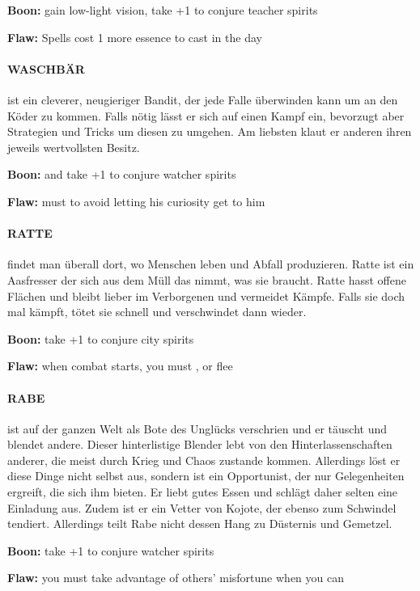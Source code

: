 \textbf{Boon:} gain low-light vision, take +1 to conjure teacher spirits

\textbf{Flaw:} Spells cost 1 more essence to cast in the day


\paragraph{WASCHBÄR} ist ein cleverer, neugieriger Bandit, der jede Falle überwinden kann um an den Köder zu kommen. Falls nötig lässt er sich auf einen Kampf ein, bevorzugt aber Strategien und Tricks um diesen zu umgehen. Am liebsten klaut er anderen ihren jeweils wertvollsten Besitz. 

\textbf{Boon:} and take +1 to conjure watcher spirits

\textbf{Flaw:} must  to avoid letting his curiosity get to him


\paragraph{RATTE} findet man überall dort, wo Menschen leben und Abfall produzieren. Ratte ist ein Aasfresser der sich aus dem Müll das nimmt, was sie braucht. Ratte hasst offene Flächen und bleibt lieber im Verborgenen und vermeidet Kämpfe. Falls sie doch mal kämpft, tötet sie schnell und verschwindet dann wieder.

\textbf{Boon:} take +1 to conjure city spirits

\textbf{Flaw:} when combat starts, you must , or flee


\paragraph{RABE} ist auf der ganzen Welt als Bote des Unglücks verschrien und er täuscht und blendet andere. Dieser hinterlistige Blender lebt von den Hinterlassenschaften anderer, die meist durch Krieg und Chaos zustande kommen. Allerdings löst er diese Dinge nicht selbst aus, sondern ist ein Opportunist, der nur Gelegenheiten ergreift, die sich ihm bieten. Er liebt gutes Essen und schlägt daher selten eine Einladung aus. Zudem ist er ein Vetter von Kojote, der ebenso zum Schwindel tendiert. Allerdings teilt Rabe nicht dessen Hang zu Düsternis und Gemetzel.

\textbf{Boon:} take +1 to conjure watcher spirits

\textbf{Flaw:} you must take advantage of others’ misfortune when you can


